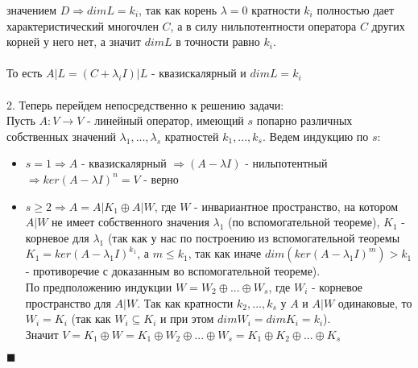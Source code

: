\documentclass[a4paper,12pt,titlepage,final]{article}
\begin{document}
значением $D \Rightarrow dimL = k_i$, так как корень $\lambda = 0$ кратности $k_i$ полностью дает характеристический 
многочлен $C$, а в силу нильпотентности оператора $C$ других корней у него нет, а значит $dimL$ в точности равно $k_i$. \\ \\
То есть $A|L = (C + \lambda_i I)|L$ - квазискалярный и $dimL = k_i$ \\ \\
2. Теперь перейдем непосредственно к решению задачи: \\
Пусть $A: V \rightarrow V$ - линейный оператор, имеющий $s$ попарно различных собственных значений $\lambda_1, ... , \lambda_s$ кратностей 
$k_1, ... , k_s$. Ведем индукцию по $s$: \\
\begin{itemize}
    \item $s = 1 \Rightarrow A$ - квазискалярный $\Rightarrow (A - \lambda I)$ - нильпотентный 
    $\Rightarrow ker(A - \lambda I)^n = V$ - верно
    \item $s \geq 2 \Rightarrow A = A|K_1 \oplus A|W$, где $W$ - инвариантное пространство, на котором $A|W$ 
    не имеет собственного значения $\lambda_1$ (по вспомогательной теореме), $K_1$ - корневое для $\lambda_1$ 
    (так как у нас по построению из вспомогательной теоремы $K_1 = ker(A - \lambda_1 I)^{k_1}$, а 
    $m \leq k_1$, так как иначе $dim(ker(A - \lambda_1 I)^m) > k_1$ - противоречие с доказанным во вспомогательной теореме). \\
    По предположению индукции $W = W_2 \oplus ... \oplus W_s$, где $W_i$ - корневое пространство для $A|W$. 
    Так как кратности $k_2, ... , k_s$ у $A$ и $A|W$ одинаковые, то $W_i = K_i$ (так как $W_i \subseteq K_i$ и при 
    этом $dimW_i = dimK_i = k_i$). \\
    Значит $V = K_1 \oplus W = K_1 \oplus W_2 \oplus ... \oplus W_s = K_1 \oplus K_2 \oplus ... \oplus K_s$ \\
\end{itemize}
$\blacksquare$ \\ \\ \\


\end{document}
